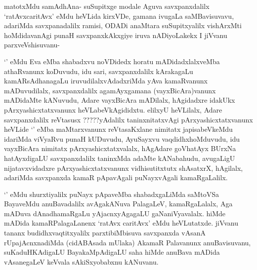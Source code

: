 \begin{artha}
matotxMdu samAdhAna- suSupitxge modale Aguva savxpanxdalilx `ratAvxcaritAvx' eMdu heVLida kirxVDe, gamana ivugaLa saMBavisuvavu, adariMda savxpanadalilx ramisi, ODADi anaMtara suSupitxyalilx vishArxMti hoMdidavanAgi punaH savxpanxkAkxgiye iruva nADiyoLakekx I jiVvanu parxveVshisuvanu-
\end{artha}%

\begin{artha}
`\stext ' eMdu Eva eMba shabadxvu noVDidedx horatu mADidadxlalxveMba athaRvanunx koDuvudu, idu sari, savxpanxdalilx kArakagaLu kamARsAdhanagaLu iruvudilalxvAdadxriMda yAva kamaRvanunx mADuvudilalx, savxpanxdalilx agamAyxgamana (vayxBicAra)vanunx mADidaMte kANuvudu, Adare vayxBicAra mADilalx, hAgidadxre idakUkx pArxyashicxtatxvanunx heVLabeVkAgididxtu. elilxyU heVLilalx, Adare savxpanxdalilx reVtasusx ?????yAdalilx taninxnitatxvAgi pArxyashicxtatxvanunx heVLide `\stext ' eMba maMtarxvanunx reVtasaKxlane nimitatx japisabeVkeMdu idariMda viVyaRvu punaH kUDuvudu, AyuSayxvu vaqdidhxhoMduvudu, idu vayxBicAra nimitatx pArxyashicxtatxvalalx, hAgAdare goVhatAyx BUrxNa hatAyxdigaLU savxpanxdalilx taninxMda adaMte kANabahudu, avugaLigU nijatavxvidadxre pArxyashicxtatxvanunx vidhisutitxtutx shAsatxrX, hAgilalx, adariMda savxpanxda kamaR pApavAgali puNayxvAgali kamaRgaLalilx.  
\end{artha}

\begin{artha}
`\stext ' eMdu shurxtiyalilx puNayx pApaveMba shabadxgaLiMda saMtoVSa BayaveMdu anuBavadalilx avAgakANuva PalagaLeV, kamaRgaLalalx, Aga mADuva dAnadhamaRgaLu yAjacnxyAgagaLU gaNaniVyavalalx. hiMde mADida kamaRPalagaLanenx `ratAvx caritAvx' eMdu heVLutatxde. jiVvanu tananx budidhxvaqtitxyalilx parxtibiMbisuva savxpanxda vAsanA rUpajAcnxnadiMda (cidABAsada mUlaka) AkamaR Palavanunx anuBavisuvanu, suKaduHKAdigaLU BayakaMpAdigaLU saha hiMde anuBava mADida vAsanegaLeV keVvala sAkiSxyobabxnu kANuvanu.
\end{artha}

